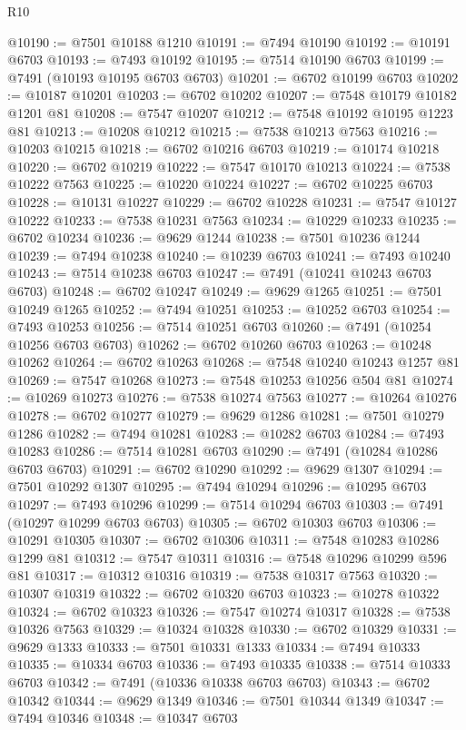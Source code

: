 \begin{lexlean}{R10}
\begin{coremodule}
@10190 := @7501 @10188 @1210
@10191 := @7494 @10190
@10192 := @10191 @6703
@10193 := @7493 @10192
@10195 := @7514 @10190 @6703
@10199 := @7491 (@10193 @10195 @6703 @6703)
@10201 := @6702 @10199 @6703
@10202 := @10187 @10201
@10203 := @6702 @10202
@10207 := @7548 @10179 @10182 @1201 @81
@10208 := @7547 @10207
@10212 := @7548 @10192 @10195 @1223 @81
@10213 := @10208 @10212
@10215 := @7538 @10213 @7563
@10216 := @10203 @10215
@10218 := @6702 @10216 @6703
@10219 := @10174 @10218
@10220 := @6702 @10219
@10222 := @7547 @10170 @10213
@10224 := @7538 @10222 @7563
@10225 := @10220 @10224
@10227 := @6702 @10225 @6703
@10228 := @10131 @10227
@10229 := @6702 @10228
@10231 := @7547 @10127 @10222
@10233 := @7538 @10231 @7563
@10234 := @10229 @10233
@10235 := @6702 @10234
@10236 := @9629 @1244
@10238 := @7501 @10236 @1244
@10239 := @7494 @10238
@10240 := @10239 @6703
@10241 := @7493 @10240
@10243 := @7514 @10238 @6703
@10247 := @7491 (@10241 @10243 @6703 @6703)
@10248 := @6702 @10247
@10249 := @9629 @1265
@10251 := @7501 @10249 @1265
@10252 := @7494 @10251
@10253 := @10252 @6703
@10254 := @7493 @10253
@10256 := @7514 @10251 @6703
@10260 := @7491 (@10254 @10256 @6703 @6703)
@10262 := @6702 @10260 @6703
@10263 := @10248 @10262
@10264 := @6702 @10263
@10268 := @7548 @10240 @10243 @1257 @81
@10269 := @7547 @10268
@10273 := @7548 @10253 @10256 @504 @81
@10274 := @10269 @10273
@10276 := @7538 @10274 @7563
@10277 := @10264 @10276
@10278 := @6702 @10277
@10279 := @9629 @1286
@10281 := @7501 @10279 @1286
@10282 := @7494 @10281
@10283 := @10282 @6703
@10284 := @7493 @10283
@10286 := @7514 @10281 @6703
@10290 := @7491 (@10284 @10286 @6703 @6703)
@10291 := @6702 @10290
@10292 := @9629 @1307
@10294 := @7501 @10292 @1307
@10295 := @7494 @10294
@10296 := @10295 @6703
@10297 := @7493 @10296
@10299 := @7514 @10294 @6703
@10303 := @7491 (@10297 @10299 @6703 @6703)
@10305 := @6702 @10303 @6703
@10306 := @10291 @10305
@10307 := @6702 @10306
@10311 := @7548 @10283 @10286 @1299 @81
@10312 := @7547 @10311
@10316 := @7548 @10296 @10299 @596 @81
@10317 := @10312 @10316
@10319 := @7538 @10317 @7563
@10320 := @10307 @10319
@10322 := @6702 @10320 @6703
@10323 := @10278 @10322
@10324 := @6702 @10323
@10326 := @7547 @10274 @10317
@10328 := @7538 @10326 @7563
@10329 := @10324 @10328
@10330 := @6702 @10329
@10331 := @9629 @1333
@10333 := @7501 @10331 @1333
@10334 := @7494 @10333
@10335 := @10334 @6703
@10336 := @7493 @10335
@10338 := @7514 @10333 @6703
@10342 := @7491 (@10336 @10338 @6703 @6703)
@10343 := @6702 @10342
@10344 := @9629 @1349
@10346 := @7501 @10344 @1349
@10347 := @7494 @10346
@10348 := @10347 @6703

\end{coremodule}
\end{lexlean}
